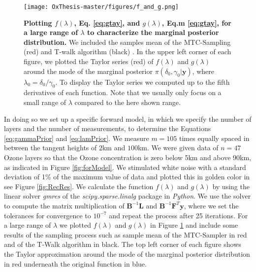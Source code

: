 \begin{figure}[htb]
\centering
\texttt{[image: OxThesis-master/figures/f\_and\_g.png]} 
\caption[Plotting $f(\lambda)$ and $g(\lambda)$ for a large range of $\lambda$ to characterize the marginal posterior distribution.]{\textbf{Plotting $f(\lambda)$, Eq. \ref{eq:gtay}, and $g(\lambda)$, Eq.m \ref{eq:gtay}, for a large range of $\lambda$ to characterize the marginal posterior distribution.}
We included the samples mean of the MTC-Sampling (red) and T-walk algorithm (black) \cite{}. In the upper left corner of each figure, we plotted the Taylor series (red) of $f(\lambda)$ and $g(\lambda)$ around the mode of the marginal posterior $\pi(\delta_0, \gamma_0 | \bm{y})$, where $\lambda_0 = \delta_0 / \gamma_0 $. To display the Taylor series we computed up to the fifth derivatives of each function. Note that we usually only focus on a small range of $\lambda$ compared to the here shown range.}
\label{fig:fandg}
\end{figure}
In doing so we set up a specific forward model, in which we specify the number of layers and the number of measurements, to determine the Equations \ref{eq:gammaPrior} and \ref{eq:lamPrior}.
We measure $m = 105$ times equally spaced in between the tangent heights of $2$km and $100$km.
We were given data of $n = 47$ Ozone layers so that the Ozone concentration is zero below 5km and above 90km, as indicated in Figure \ref{fig:forModel}.
We stimulated white noise with a standard deviation of 1\% of the maximum value of data and plotted this in golden color in see Figure \ref{fig:RecRes}.
We calculate the function $f(\lambda)$ and $g(\lambda)$ by using the linear solver \textit{gmres} of the \textit{scipy.sparse.linalg} package in \textit{Python}.
We use the solver to compute the matrix multiplication of $\bm{B}^{-1}\bm{L}$ and $\bm{B}^{-1} \bm{F}^T \bm{y}$, where we set the tolerances for convergence to $10^{-7}$ and repeat the process after 25 iterations.
For a large range of $\lambda$ we plotted $f(\lambda)$ and $g(\lambda)$ in Figure \ref{fig:fandg} and include some results of the sampling process such as sample mean of the MTC-Sampler in red and of the T-Walk algorithm in black.
The top left corner of each figure shows the Taylor approximation around the mode of the marginal posterior distribution in red underneath the original function in blue.

